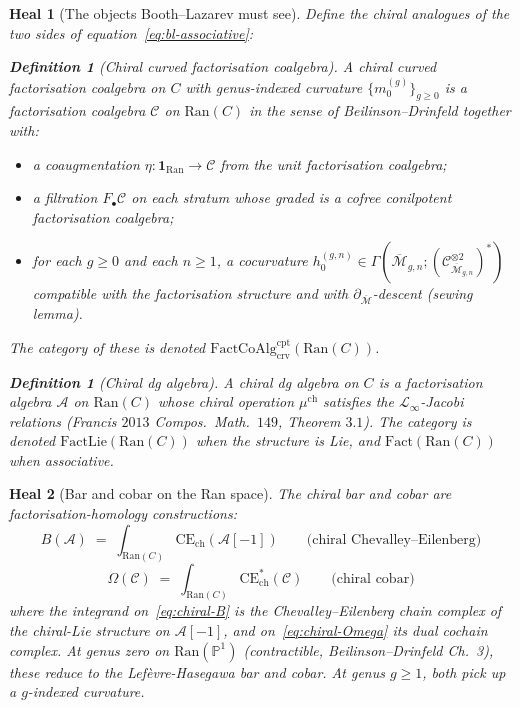 \documentclass[11pt]{amsart}
\newtheorem*{heal}{Heal}
\newtheorem{definition}[theorem]{Definition}
\newcommand{\cA}{\mathcal{A}}
\newcommand{\cC}{\mathcal{C}}
\newcommand{\cL}{\mathcal{L}}
\newcommand{\cM}{\mathcal{M}}
\newcommand{\Ran}{\mathrm{Ran}}
\newcommand{\Fact}{\mathrm{Fact}}
\newcommand{\FactCoAlg}{\mathrm{FactCoAlg}}
\newcommand{\FactLie}{\mathrm{FactLie}}
\newcommand{\crv}{\mathrm{crv}}
\newcommand{\cpt}{\mathrm{cpt}}
\newcommand{\CE}{\mathrm{CE}}
\newcommand{\Mbar}{\overline{\cM}}
\begin{document}
\begin{heal}[The objects Booth--Lazarev must see]
Define the chiral analogues of the two sides of
equation~\eqref{eq:bl-associative}:
\begin{definition}[Chiral curved factorisation coalgebra]
\label{def:chiral-crv-factcoalg}
A \emph{chiral curved factorisation coalgebra} on $C$ with genus-indexed
curvature $\{m_0^{(g)}\}_{g\geq 0}$ is a factorisation coalgebra $\cC$
on $\Ran(C)$ in the sense of Beilinson--Drinfeld together with:
\begin{itemize}
\item a coaugmentation $\eta:\mathbf{1}_{\Ran}\to\cC$ from the unit
factorisation coalgebra;
\item a filtration $F_\bullet\cC$ on each stratum whose graded is a
cofree conilpotent factorisation coalgebra;
\item for each $g\geq 0$ and each $n\geq 1$, a cocurvature
$h_0^{(g,n)}\in\Gamma(\Mbar_{g,n};(\cC^{\otimes 2}_{\Mbar_{g,n}})^*)$
compatible with the factorisation structure and with
$\partial_{\Mbar}$-descent (sewing lemma).
\end{itemize}
The category of these is denoted
$\FactCoAlg^{\cpt}_{\crv}(\Ran(C))$.
\end{definition}
\begin{definition}[Chiral dg algebra]
A \emph{chiral dg algebra} on $C$ is a factorisation algebra $\cA$ on
$\Ran(C)$ whose chiral operation
$\mu^{\mathrm{ch}}$ satisfies the $\cL_\infty$-Jacobi relations
(Francis $2013$ \emph{Compos.\ Math.}\ $149$, Theorem $3.1$). The
category is denoted $\FactLie(\Ran(C))$ when the structure is Lie,
and $\Fact(\Ran(C))$ when associative.
\end{definition}
\end{heal}

\begin{heal}[Bar and cobar on the Ran space]
The chiral bar and cobar are factorisation-homology constructions:
\begin{equation}
B(\cA) \;=\; \int_{\Ran(C)} \CE_{\mathrm{ch}}(\cA[-1])
\qquad\text{(chiral Chevalley--Eilenberg)}
\label{eq:chiral-B}
\end{equation}
\begin{equation}
\Omega(\cC) \;=\; \int_{\Ran(C)} \CE^*_{\mathrm{ch}}(\cC)
\qquad\text{(chiral cobar)}
\label{eq:chiral-Omega}
\end{equation}
where the integrand on~\eqref{eq:chiral-B} is the Chevalley--Eilenberg
chain complex of the chiral-Lie structure on $\cA[-1]$, and
on~\eqref{eq:chiral-Omega} its dual cochain complex. At genus zero on
$\Ran(\mathbb{P}^1)$ (contractible, Beilinson--Drinfeld Ch.~3), these
reduce to the Lef\`evre-Hasegawa bar and cobar. At genus $g\geq 1$,
both pick up a $g$-indexed curvature.
\end{heal}
\end{document}

